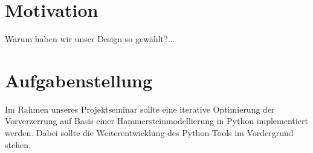 \documentclass[../Report.tex]{subfiles}
\begin{document}
\section{Motivation}
\label{sec:einf.motivation}
Warum haben wir unser Design so gewählt?...

\section{Aufgabenstellung}
\label{sec:einf.problem}
Im Rahmen unseres Projektseminar sollte eine iterative Optimierung der Vorverzerrung auf Basis einer Hammersteinmodellierung in Python implementiert werden. Dabei sollte die Weiterentwicklung des Python-Tools im Vordergrund stehen.
\end{document}
